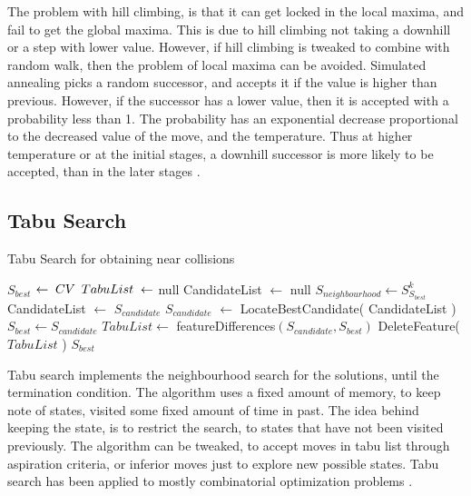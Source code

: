 The problem with hill climbing, is that it can get locked in the local maxima, and fail to get the global maxima.
This is due to hill climbing not taking a downhill or a step with lower value. However, if hill climbing is 
tweaked to combine with random walk, then the problem of local maxima can be avoided. Simulated annealing picks
a random successor, and accepts it if the value is higher than previous. However, if the successor has a lower
value, then it is accepted with a probability less than 1. The probability has an exponential decrease proportional
to the decreased value of the move, and the temperature. Thus at higher temperature or at the initial stages, a
downhill successor is more likely to be accepted, than in the later stages \cite{00033}.

\subsection{Tabu Search}

\begin{algorithm}[h]
  \caption{ Tabu Search for obtaining near collisions \cite{00036}}
  \begin{algorithmic}[1]
      \State $S_{best}$ $\gets \thickspace CV$
      \State $TabuList \thickspace \gets$ null
        \State CandidateList $\gets$ null
        \State $S_{neighbourhood} \gets S^{k}_{S_{best}}$
            \State CandidateList $\gets$ $S_{candidate}$
          \EndIf
        \EndFor
        \State $S_{candidate}$ $\gets$ LocateBestCandidate( CandidateList )
          \State $S_{best} \gets S_{candidate}$
          \State $TabuList \gets$ featureDifferences$(S_{candidate}, S_{best})$
            \State DeleteFeature( $TabuList$ )
          \EndWhile
        \EndIf
      \EndWhile 
      \State \Return $S_{best}$
    \EndFunction
  \end{algorithmic}
\end{algorithm}

Tabu search implements the neighbourhood search for the solutions, until the termination condition. The algorithm
uses a fixed amount of memory, to keep note of states, visited some fixed amount of time in past. The idea behind
keeping the state, is to restrict the search, to states that have not been visited previously. The algorithm can be
tweaked, to accept moves in tabu list through aspiration criteria, or inferior moves just to explore new possible
states. Tabu search has been applied to mostly combinatorial optimization problems \cite{00034, 00035}.

